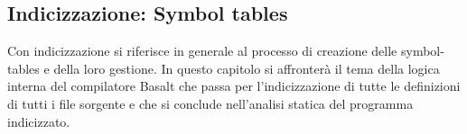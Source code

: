 \subsection{Indicizzazione: Symbol tables}
Con indicizzazione si riferisce in generale al processo di creazione delle symbol-tables
e della loro gestione. In questo capitolo si affronterà il tema della logica interna 
del compilatore Basalt che passa per l'indicizzazione di tutte le definizioni di tutti i file 
sorgente e che si conclude nell'analisi statica del programma indicizzato. \\


\newpage


\newpage


\newpage


\newpage


\newpage


\newpage
